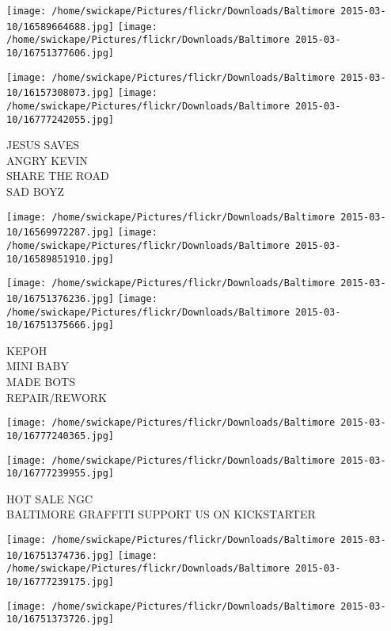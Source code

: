 \documentclass[10pt,letterpaper]{article}
\begin{document}
\texttt{[image: /home/swickape/Pictures/flickr/Downloads/Baltimore 2015-03-10/16589664688.jpg]}
\texttt{[image: /home/swickape/Pictures/flickr/Downloads/Baltimore 2015-03-10/16751377606.jpg]}

\texttt{[image: /home/swickape/Pictures/flickr/Downloads/Baltimore 2015-03-10/16157308073.jpg]}
\texttt{[image: /home/swickape/Pictures/flickr/Downloads/Baltimore 2015-03-10/16777242055.jpg]}

JESUS SAVES\\
ANGRY KEVIN\\
SHARE THE ROAD\\
SAD BOYZ\\
\pagebreak

\texttt{[image: /home/swickape/Pictures/flickr/Downloads/Baltimore 2015-03-10/16569972287.jpg]}
\texttt{[image: /home/swickape/Pictures/flickr/Downloads/Baltimore 2015-03-10/16589851910.jpg]}

\texttt{[image: /home/swickape/Pictures/flickr/Downloads/Baltimore 2015-03-10/16751376236.jpg]}
\texttt{[image: /home/swickape/Pictures/flickr/Downloads/Baltimore 2015-03-10/16751375666.jpg]}

KEPOH\\
MINI BABY\\
MADE BOTS\\
REPAIR/REWORK\\
\pagebreak

\texttt{[image: /home/swickape/Pictures/flickr/Downloads/Baltimore 2015-03-10/16777240365.jpg]}

\vspace{0.25in}
\texttt{[image: /home/swickape/Pictures/flickr/Downloads/Baltimore 2015-03-10/16777239955.jpg]}

HOT SALE NGC\\
BALTIMORE GRAFFITI SUPPORT US ON KICKSTARTER\\
\pagebreak

\texttt{[image: /home/swickape/Pictures/flickr/Downloads/Baltimore 2015-03-10/16751374736.jpg]}
\texttt{[image: /home/swickape/Pictures/flickr/Downloads/Baltimore 2015-03-10/16777239175.jpg]}

\vspace{0.25in}
\texttt{[image: /home/swickape/Pictures/flickr/Downloads/Baltimore 2015-03-10/16751373726.jpg]}
\end{document}
